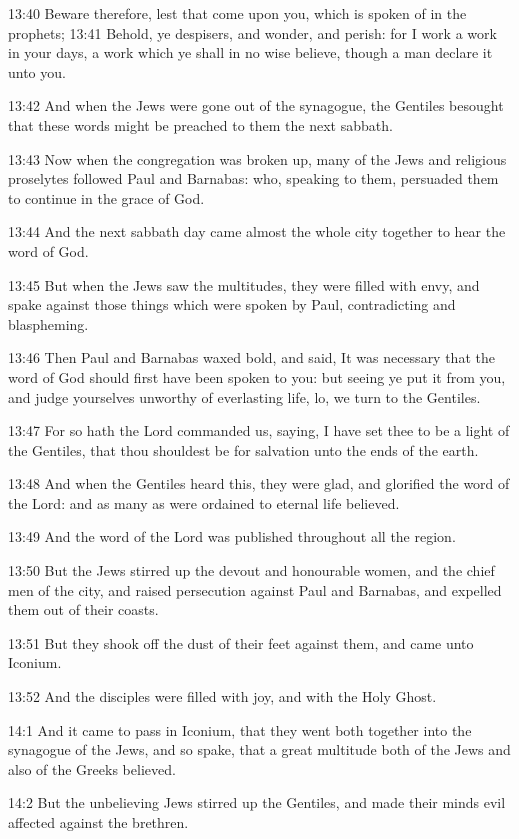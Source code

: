13:40 Beware therefore, lest that come upon you, which is spoken of in
the prophets; 13:41 Behold, ye despisers, and wonder, and perish: for
I work a work in your days, a work which ye shall in no wise believe,
though a man declare it unto you.

13:42 And when the Jews were gone out of the synagogue, the Gentiles
besought that these words might be preached to them the next sabbath.

13:43 Now when the congregation was broken up, many of the Jews and
religious proselytes followed Paul and Barnabas: who, speaking to
them, persuaded them to continue in the grace of God.

13:44 And the next sabbath day came almost the whole city together to
hear the word of God.

13:45 But when the Jews saw the multitudes, they were filled with
envy, and spake against those things which were spoken by Paul,
contradicting and blaspheming.

13:46 Then Paul and Barnabas waxed bold, and said, It was necessary
that the word of God should first have been spoken to you: but seeing
ye put it from you, and judge yourselves unworthy of everlasting life,
lo, we turn to the Gentiles.

13:47 For so hath the Lord commanded us, saying, I have set thee to be
a light of the Gentiles, that thou shouldest be for salvation unto the
ends of the earth.

13:48 And when the Gentiles heard this, they were glad, and glorified
the word of the Lord: and as many as were ordained to eternal life
believed.

13:49 And the word of the Lord was published throughout all the
region.

13:50 But the Jews stirred up the devout and honourable women, and the
chief men of the city, and raised persecution against Paul and
Barnabas, and expelled them out of their coasts.

13:51 But they shook off the dust of their feet against them, and came
unto Iconium.

13:52 And the disciples were filled with joy, and with the Holy Ghost.

14:1 And it came to pass in Iconium, that they went both together into
the synagogue of the Jews, and so spake, that a great multitude both
of the Jews and also of the Greeks believed.

14:2 But the unbelieving Jews stirred up the Gentiles, and made their
minds evil affected against the brethren.

